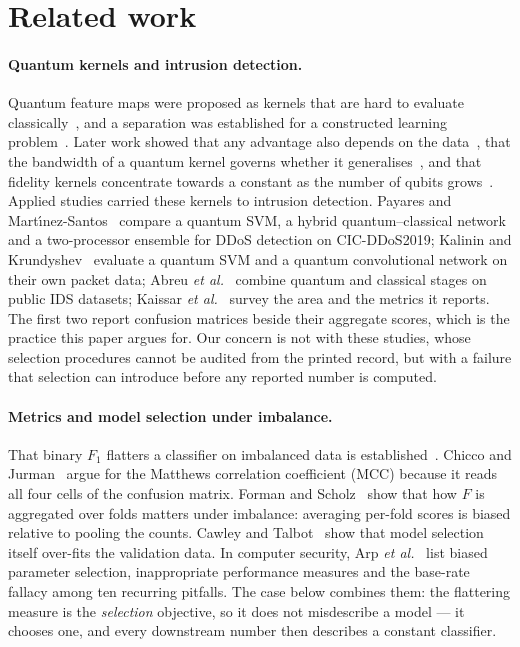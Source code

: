 \documentclass[runningheads]{llncs}
\newcommand{\Fone}{F_1}
\begin{document}
\section{Related work}\label{sec:related}

\paragraph{Quantum kernels and intrusion detection.}
Quantum feature maps were proposed as kernels that are hard to evaluate
classically~\cite{havlicek2019,schuld2019hilbert}, and a separation was
established for a constructed learning problem~\cite{liu2021speedup}. Later
work showed that any advantage also depends on the data~\cite{huang2021power},
that the bandwidth of a quantum kernel governs whether it
generalises~\cite{shaydulin2022bandwidth}, and that fidelity kernels
concentrate towards a constant as the number of qubits
grows~\cite{thanasilp2024concentration}. Applied studies carried these kernels
to intrusion detection. Payares and Mart\'{\i}nez-Santos~\cite{payares2021dos}
compare a quantum SVM, a hybrid quantum--classical network and a two-processor
ensemble for DDoS detection on CIC-DDoS2019; Kalinin and
Krundyshev~\cite{kalinin2023qids} evaluate a quantum SVM and a quantum
convolutional network on their own packet data; Abreu
\emph{et al.}~\cite{abreu2025quantumnetsec} combine quantum and classical
stages on public IDS datasets; Kaissar \emph{et al.}~\cite{kaissar2026survey}
survey the area and the metrics it reports. The first two report confusion
matrices beside their aggregate scores, which is the practice this paper
argues for. Our concern is not with these studies, whose selection procedures
cannot be audited from the printed record, but with a failure that selection
can introduce before any reported number is computed.

\paragraph{Metrics and model selection under imbalance.}
That binary $\Fone$ flatters a classifier on imbalanced data is
established~\cite{he2009imbalanced,chicco2020mcc,christen2023fmeasure,saito2015prc}.
Chicco and Jurman~\cite{chicco2020mcc} argue for the Matthews correlation
coefficient (MCC) because it reads all four cells of the confusion matrix.
Forman and Scholz~\cite{forman2010apples} show that how $F$ is aggregated over
folds matters under imbalance: averaging per-fold scores is biased relative to
pooling the counts. Cawley and Talbot~\cite{cawley2010overfitting} show that
model selection itself over-fits the validation data. In computer security,
Arp \emph{et al.}~\cite{arp2022mlsec} list biased parameter selection,
inappropriate performance measures and the base-rate fallacy among ten
recurring pitfalls. The case below combines them: the flattering measure is
the \emph{selection} objective, so it does not misdescribe a model --- it
chooses one, and every downstream number then describes a constant classifier.
\end{document}
